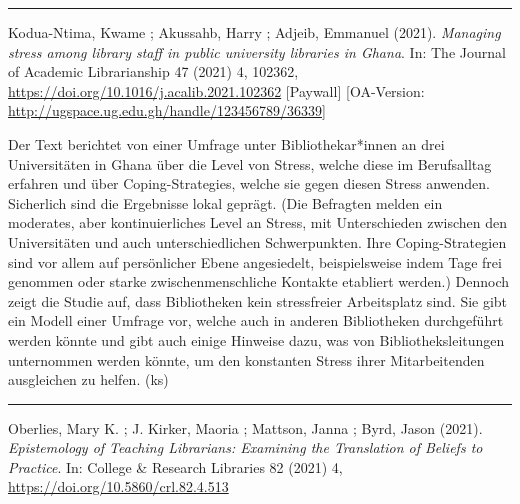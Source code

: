 \documentclass[a4paper,
fontsize=11pt,
oneside,
numbers=noperiodatend,
parskip=half-,
bibliography=totoc,
final
]{scrartcl}
\begin{document}
\begin{center}\rule{0.5\linewidth}{0.5pt}\end{center}

Kodua-Ntima, Kwame ; Akussahb, Harry ; Adjeib, Emmanuel (2021).
\emph{Managing stress among library staff in public university libraries
in Ghana}. In: The Journal of Academic Librarianship 47 (2021) 4,
102362, \url{https://doi.org/10.1016/j.acalib.2021.102362} {[}Paywall{]}
{[}OA-Version: \url{http://ugspace.ug.edu.gh/handle/123456789/36339}{]}

Der Text berichtet von einer Umfrage unter Bibliothekar*innen an drei
Universitäten in Ghana über die Level von Stress, welche diese im
Berufsalltag erfahren und über Coping-Strategies, welche sie gegen
diesen Stress anwenden. Sicherlich sind die Ergebnisse lokal geprägt.
(Die Befragten melden ein moderates, aber kontinuierliches Level an
Stress, mit Unterschieden zwischen den Universitäten und auch
unterschiedlichen Schwerpunkten. Ihre Coping-Strategien sind vor allem
auf persönlicher Ebene angesiedelt, beispielsweise indem Tage frei
genommen oder starke zwischenmenschliche Kontakte etabliert werden.)
Dennoch zeigt die Studie auf, dass Bibliotheken kein stressfreier
Arbeitsplatz sind. Sie gibt ein Modell einer Umfrage vor, welche auch in
anderen Bibliotheken durchgeführt werden könnte und gibt auch einige
Hinweise dazu, was von Bibliotheksleitungen unternommen werden könnte,
um den konstanten Stress ihrer Mitarbeitenden ausgleichen zu helfen.
(ks)

\begin{center}\rule{0.5\linewidth}{0.5pt}\end{center}

Oberlies, Mary K. ; J. Kirker, Maoria ; Mattson, Janna ; Byrd, Jason
(2021). \emph{Epistemology of Teaching Librarians: Examining the
Translation of Beliefs to Practice}. In: College \& Research Libraries
82 (2021) 4, \url{https://doi.org/10.5860/crl.82.4.513}
\end{document}
